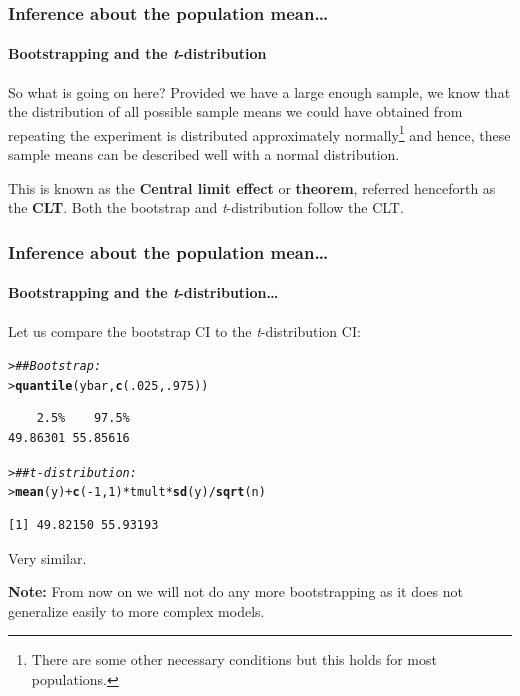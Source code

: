 \documentclass{beamer}\usepackage[]{graphicx}\usepackage[]{xcolor}
\makeatletter
\newcommand{\hlnum}[1]{\textcolor[rgb]{0.686,0.059,0.569}{#1}}%
\newcommand{\hlcom}[1]{\textcolor[rgb]{0.678,0.584,0.686}{\textit{#1}}}%
\newcommand{\hlopt}[1]{\textcolor[rgb]{0,0,0}{#1}}%
\newcommand{\hlstd}[1]{\textcolor[rgb]{0.345,0.345,0.345}{#1}}%
\newcommand{\hlkwd}[1]{\textcolor[rgb]{0.737,0.353,0.396}{\textbf{#1}}}%
\newenvironment{kframe}{%
 \def\at@end@of@kframe{}%
 \ifinner\ifhmode%
  \def\at@end@of@kframe{\end{minipage}}%
  \begin{minipage}{\columnwidth}%
 \fi\fi%
 \def\FrameCommand##1{\hskip\@totalleftmargin \hskip-\fboxsep
 \colorbox{shadecolor}{##1}\hskip-\fboxsep
     \hskip-\linewidth \hskip-\@totalleftmargin \hskip\columnwidth}%
 \MakeFramed {\advance\hsize-\width
   \@totalleftmargin\z@ \linewidth\hsize
   \@setminipage}}%
 {\par\unskip\endMakeFramed%
 \at@end@of@kframe}
\newenvironment{knitrout}{}{} %
\makeatother
\begin{document}
\begin{frame}[fragile]
\frametitle{Inference about the population mean\ldots}
\framesubtitle{Bootstrapping and the \textit{t}-distribution}  
So what is going on here? 
Provided we have a large enough sample, 
we know that the distribution of all possible sample means we could have obtained from repeating the experiment is distributed approximately normally\footnote{There are some other necessary conditions 
but this holds for most populations.} 
and hence, these sample means can be described well with a normal distribution.

\medskip

This is known as the \textbf{Central limit effect} or \textbf{theorem}, referred henceforth as the \textbf{CLT}. Both the bootstrap and \textit{t}-distribution follow the CLT.
\end{frame}

\begin{frame}[fragile]
\frametitle{Inference about the population mean\ldots}
\framesubtitle{Bootstrapping and the \textit{t}-distribution\ldots}  
Let us compare the bootstrap CI to the \textit{t}-distribution CI:
\begin{knitrout}\scriptsize
{}\color{fgcolor}\begin{kframe}
\begin{alltt}
\hlstd{> }\hlcom{## Bootstrap:}
\hlstd{> }\hlkwd{quantile}\hlstd{(ybar,} \hlkwd{c}\hlstd{(}\hlnum{.025}\hlstd{,} \hlnum{.975}\hlstd{))}
\end{alltt}
\begin{verbatim}
    2.5%    97.5% 
49.86301 55.85616 
\end{verbatim}
\begin{alltt}
\hlstd{> }\hlcom{## t-distribution:}
\hlstd{> }\hlkwd{mean}\hlstd{(y)} \hlopt{+} \hlkwd{c}\hlstd{(}\hlopt{-}\hlnum{1}\hlstd{,}\hlnum{1}\hlstd{)}\hlopt{*}\hlstd{tmult}\hlopt{*}\hlkwd{sd}\hlstd{(y)}\hlopt{/}\hlkwd{sqrt}\hlstd{(n)}
\end{alltt}
\begin{verbatim}
[1] 49.82150 55.93193
\end{verbatim}
\end{kframe}
\end{knitrout}

Very similar.

\textbf{Note:} From now on we will not do any more bootstrapping as it does not generalize easily to more complex models. 

\end{frame}
\end{document}
